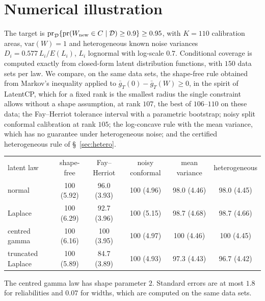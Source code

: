 \documentclass[lineno]{biometrika}
\newcommand{\pr}{\mathrm{pr}}
\newcommand{\var}{\mathrm{var}}
\begin{document}
\section{Numerical illustration}\label{sec:numerical}

The target is $\pr_{\mathcal D}\{\pr(W_{\rm new} \in C \mid \mathcal D) \ge 0.9\} \ge 0.95$, with $K = 110$ calibration areas, $\var(W) = 1$ and heterogeneous known noise variances $D_i = 0.577\,L_i/E(L_i)$, $L_i$ lognormal with log-scale $0.7$. Conditional coverage is computed exactly from closed-form latent distribution functions, with $150$ data sets per law. We compare, on the same data sets, the shape-free rule obtained from Markov's inequality applied to $\bar g_T(0) - \bar g_T(W) \ge 0$, in the spirit of LatentCP, which for a fixed rank is the smallest radius the single constraint allows without a shape assumption, at rank $107$, the best of $106$--$110$ on these data; the Fay--Herriot tolerance interval with a parametric bootstrap; noisy split conformal calibration at rank $105$; the log-concave rule with the mean variance, which has no guarantee under heterogeneous noise; and the certified heterogeneous rule of \S~\ref{sec:hetero}.

\begin{table}
{\begin{tabular}{lccccc}
latent law & shape-free & Fay--Herriot & noisy conformal & mean variance & heterogeneous \\
normal & 100 (5.92) & 96.0 (3.93) & 100 (4.96) & 98.0 (4.46) & 98.0 (4.45) \\
Laplace & 100 (6.29) & 92.7 (3.96) & 100 (5.15) & 98.7 (4.68) & 98.7 (4.66) \\
centred gamma & 100 (6.16) & 100 (3.95) & 100 (4.97) & 100 (4.46) & 100 (4.45) \\
truncated Laplace & 100 (5.89) & 84.7 (3.89) & 100 (4.93) & 97.3 (4.43) & 96.7 (4.42) \\
\end{tabular}}
\label{tab:synth}
\begin{tabnote}
The centred gamma law has shape parameter $2$. Standard errors are at most $1.8$ for reliabilities and $0.07$ for widths, which are computed on the same data sets.
\end{tabnote}
\end{table}
\end{document}
